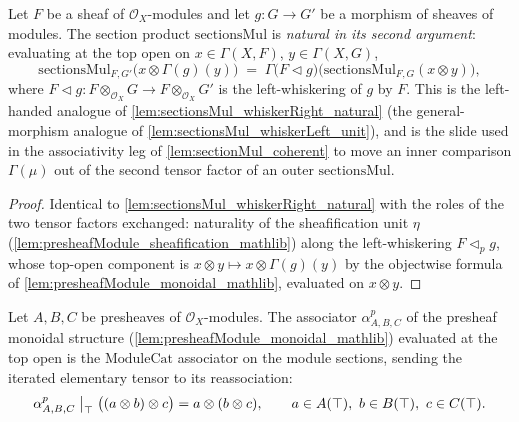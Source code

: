 \begin{lemma}\leanok
  \label{lem:sectionsMul_whiskerLeft_natural}
  Let \(F\) be a sheaf of \(\mathcal{O}_X\)-modules and let \(g : G \to G'\) be a
  morphism of sheaves of modules. The section product \(\mathrm{sectionsMul}\) is
  \emph{natural in its second argument}: evaluating at the top open on
  \(x \in \Gamma(X,F)\), \(y \in \Gamma(X,G)\),
  \[
    \mathrm{sectionsMul}_{F,G'}\bigl(x \otimes \Gamma(g)(y)\bigr)
      \;=\;
    \Gamma\bigl(F \lhd g\bigr)\bigl(\mathrm{sectionsMul}_{F,G}(x \otimes y)\bigr),
  \]
  where \(F \lhd g : F \otimes_{\mathcal{O}_X} G \to F \otimes_{\mathcal{O}_X} G'\) is
  the left-whiskering of \(g\) by \(F\). This is the left-handed analogue of
  \cref{lem:sectionsMul_whiskerRight_natural} (the general-morphism analogue of
  \cref{lem:sectionsMul_whiskerLeft_unit}), and is the slide used in the associativity
  leg of \cref{lem:sectionMul_coherent} to move an inner comparison \(\Gamma(\mu)\) out
  of the second tensor factor of an outer \(\mathrm{sectionsMul}\).
\end{lemma}

\begin{proof}
  \leanok

  Identical to \cref{lem:sectionsMul_whiskerRight_natural} with the roles of the two
  tensor factors exchanged: naturality of the sheafification unit \(\eta\)
  (\cref{lem:presheafModule_sheafification_mathlib}) along the left-whiskering
  \(F \lhd_p g\), whose top-open component is
  \(x \otimes y \mapsto x \otimes \Gamma(g)(y)\) by the objectwise formula of
  \cref{lem:presheafModule_monoidal_mathlib}, evaluated on \(x \otimes y\).
\end{proof}

\begin{lemma}\leanok
  \label{lem:presheafAssociator_top_apply}
  Let \(A, B, C\) be presheaves of \(\mathcal{O}_X\)-modules. The associator
  \(\alpha^{p}_{A,B,C}\) of the presheaf monoidal structure
  (\cref{lem:presheafModule_monoidal_mathlib}) evaluated at the top open is the
  \(\mathrm{ModuleCat}\) associator on the module sections, sending the iterated
  elementary tensor to its reassociation:
  \[
    \alpha^{p}_{A,B,C}\bigm|_{\top}\bigl((a \otimes b) \otimes c\bigr)
      = a \otimes (b \otimes c),
    \qquad a \in A(\top),\ b \in B(\top),\ c \in C(\top).
  \]
\end{lemma}


